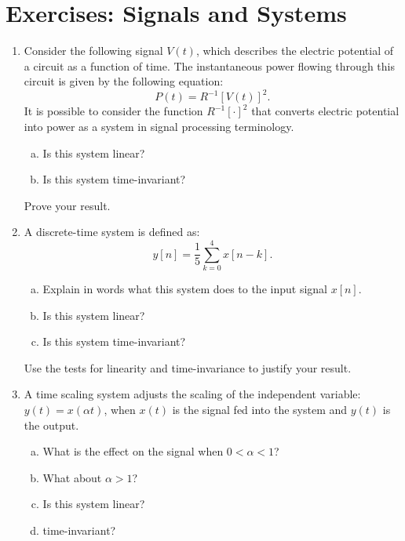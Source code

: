 \newpage
\section{Exercises: Signals and Systems}
\begin{enumerate}

\item Consider the following signal $V(t)$, which describes the electric potential of a circuit as a function of time. The instantaneous power flowing through this circuit is given by the following equation:
\begin{equation*}
    P(t)=R^{-1}[V(t)]^2.
\end{equation*}
It is possible to consider the function $R^{-1}[\cdot]^2$ that converts electric potential into power as a system in signal processing terminology.
\begin{enumerate}[a)]
\item Is this system linear?
\item Is this system time-invariant?
\end{enumerate}
Prove your result.

\item A discrete-time system is defined as:
\begin{equation}
  y[n]= \frac{1}{5}\sum_{k=0}^{4} x[n-k].
\end{equation}
  \begin{enumerate}[a)]
  \item Explain in words what this system does to the input signal $x[n]$.
  \item Is this system linear?
  \item Is this system time-invariant?
  \end{enumerate}
Use the tests for linearity and time-invariance to justify your result. 

\item A time scaling system adjusts the scaling of the independent variable: $y(t) = x(\alpha t)$,
when $x(t)$ is the signal fed into the system and $y(t)$ is the output.

\begin{enumerate}[a)]
\item What is the effect on the signal when $0<\alpha<1$?
\item What about $\alpha>1$?
\item Is this system linear?
\item time-invariant?
\end{enumerate}


\end{enumerate}

